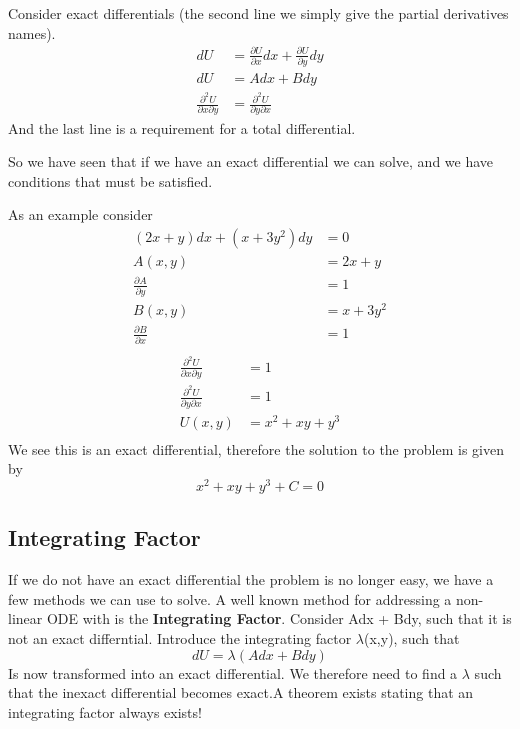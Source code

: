 \documentclass{article}
\newcommand{\be}{\begin{equation}}
\newcommand{\ee}{\end{equation}}
\newcommand{\pd}{\partial}
\begin{document}
Consider exact differentials (the second line we simply give the partial derivatives names).
\be
\begin{split}
    dU &= \frac{\pd U}{\pd x} dx + \frac{\pd U}{\pd y} dy \\
    dU &= A dx + B dy \\
    \frac{\pd ^2 U}{\pd x \pd y} &= \frac{\pd ^2 U}{\pd y \pd x}
\end{split}
\ee
And the last line is a requirement for a total differential.

So we have seen that if we have an exact differential we can solve, and we have conditions that must be satisfied.

As an example consider
\be
\begin{split}
(2x+y)dx + (x+3y^2)dy &= 0 \\
A(x,y) & = 2x+y  \\
\frac{\partial A}{\partial y} &= 1 \\
B(x,y) & = x+ 3y^2  \\
\frac{\partial B}{\partial x} &= 1 \\
\end{split}
\ee
\be
\begin{split}
    \frac{\pd ^2 U}{\pd x \pd y} &= 1\\
    \frac{\pd ^2 U}{\pd y \pd x} &= 1\\
    U(x,y) &= x^2 + xy + y^3\\
\end{split}
\ee
We see this is an exact differential, therefore the solution to the problem is given  by
\be
x^2 + xy + y^3 + C = 0
\ee
\subsection*{Integrating Factor}
If we do not have an exact differential the problem is no longer easy, we have a few methods we can use to solve.
A well known method for addressing a non-linear ODE with is the \textbf{Integrating Factor}.
Consider Adx + Bdy, such that it is not an exact differntial.
Introduce the integrating factor $\lambda$(x,y), such that
\be
dU = \lambda(Adx + Bdy)
\ee
Is now transformed into an exact differential.
We therefore need to find a $\lambda$ such that the inexact differential becomes exact.A theorem exists stating that an integrating factor always exists!
\end{document}
